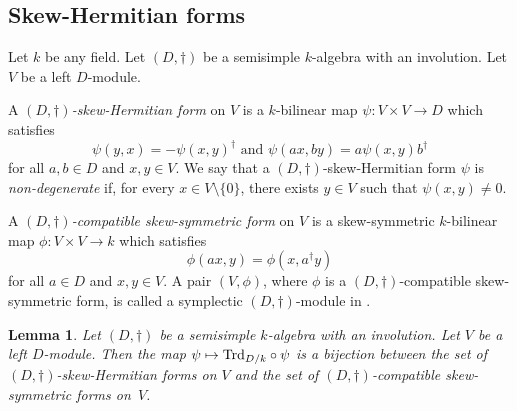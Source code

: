 \documentclass[JEP,XML,SOM,Unicode,NoFloatCountersInSection]{cedram}
\def\mto{\mathchoice{\longmapsto}{\mapsto}{\mapsto}{\mapsto}}
\DeclareMathOperator{\Trd}{Trd}
\newcommand{\defterm}[1]{\emph{#1}}
\newtheorem{lemma}{Lemma}[section]
\begin{document}
\subsection{Skew-Hermitian forms} \label{subsec:skew-hermitian-forms}

Let $k$ be any field.
Let $(D, \dag)$ be a semisimple $k$\nobreakdash-algebra with an involution.
Let $V$ be a left $D$-module.

A \defterm{$(D,\dag)$-skew-Hermitian form} on $V$ is a $k$-bilinear map $\psi \colon V \times V \to D$ which satisfies
\[
\psi(y,x) = -\psi(x,y)^\dag \text{ and } \psi(ax, by) = a\psi(x,y)b^\dag
\]
for all $a, b \in D$ and $x,y \in V$.
We say that a $(D,\dag)$-skew-Hermitian form $\psi$ is \defterm{non-degenerate} if, for every $x \in V \setminus \{0\}$, there exists $y \in V$ such that $\psi(x,y) \neq 0$.

A \defterm{$(D,\dag)$-compatible skew-symmetric form} on $V$ is a skew-symmetric $k$-bilinear map $\phi \colon V \times V \to k$ which satisfies
\[
\phi(ax, y) = \phi(x, a^\dag y)
\]
for all $a \in D$ and $x,y \in V$.
A pair $(V,\phi)$, where $\phi$ is a $(D,\dag)$-compatible skew-symmetric form, is called a symplectic $(D,\dag)$-module in \cite[\S 8]{Mil05}.

\begin{lemma} \label{tr-skew-hermitian-form}
Let $(D, \dag)$ be a semisimple $k$-algebra with an involution.
Let $V$ be a left $D$-module.
Then the map $\psi \mto {\Trd_{D/k}} \circ \psi$ is a bijection between the set of $(D,\dag)$-skew-Hermitian forms on $V$ and the set of $(D,\dag)$-compatible skew-symmetric forms on~$V$.
\end{lemma}
\end{document}
